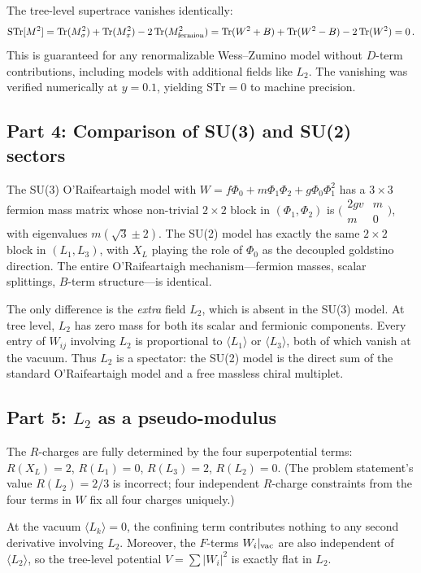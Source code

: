 \documentclass[12pt]{article}
\begin{document}
The tree-level supertrace vanishes identically:
$$
\mathrm{STr}[M^2] = \mathrm{Tr}(M^2_\sigma) + \mathrm{Tr}(M^2_\pi) - 2\,\mathrm{Tr}(M^2_{\rm fermion}) = \mathrm{Tr}(W^2+B) + \mathrm{Tr}(W^2-B) - 2\,\mathrm{Tr}(W^2) = 0\,.
$$
This is guaranteed for any renormalizable Wess--Zumino model without $D$-term contributions, including models with additional fields like $L_2$. The vanishing was verified numerically at $y = 0.1$, yielding $\mathrm{STr} = 0$ to machine precision.

\subsection*{Part 4: Comparison of SU(3) and SU(2) sectors}

The SU(3) O'Raifeartaigh model with $W = f\Phi_0 + m\Phi_1\Phi_2 + g\Phi_0\Phi_1^2$ has a $3\times 3$ fermion mass matrix whose non-trivial $2\times 2$ block in $(\Phi_1,\Phi_2)$ is $\bigl(\begin{smallmatrix} 2gv & m \\ m & 0\end{smallmatrix}\bigr)$, with eigenvalues $m(\sqrt{3}\pm 2)$. The SU(2) model has exactly the same $2\times 2$ block in $(L_1,L_3)$, with $X_L$ playing the role of $\Phi_0$ as the decoupled goldstino direction. The entire O'Raifeartaigh mechanism---fermion masses, scalar splittings, $B$-term structure---is identical.

The only difference is the \emph{extra} field $L_2$, which is absent in the SU(3) model. At tree level, $L_2$ has zero mass for both its scalar and fermionic components. Every entry of $W_{ij}$ involving $L_2$ is proportional to $\langle L_1\rangle$ or $\langle L_3\rangle$, both of which vanish at the vacuum. Thus $L_2$ is a spectator: the SU(2) model is the direct sum of the standard O'Raifeartaigh model and a free massless chiral multiplet.

\subsection*{Part 5: $L_2$ as a pseudo-modulus}

The $R$-charges are fully determined by the four superpotential terms: $R(X_L)=2$, $R(L_1)=0$, $R(L_3)=2$, $R(L_2)=0$. (The problem statement's value $R(L_2)=2/3$ is incorrect; four independent $R$-charge constraints from the four terms in $W$ fix all four charges uniquely.)

At the vacuum $\langle L_k\rangle = 0$, the confining term contributes nothing to any second derivative involving $L_2$. Moreover, the $F$-terms $W_i|_{\rm vac}$ are also independent of $\langle L_2\rangle$, so the tree-level potential $V = \sum|W_i|^2$ is exactly flat in $L_2$.
\end{document}
